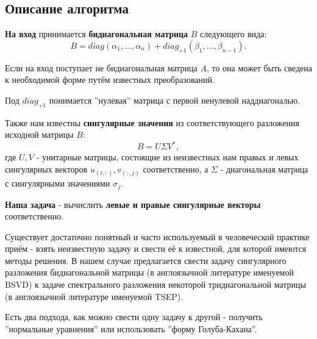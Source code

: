 

\subsection{Описание алгоритма}
\textbf{На вход} принимается \textbf{бидиагональная матрица} \(B\) следующего вида:
\[
        B= diag(\alpha_1,\dots,\alpha_n)+diag_{+1}(\beta_1,\dots,\beta_{n-1}).
\]

\begin{note}
    Если на вход поступает не бидиагональная матрица \(A\), то она может быть сведена к необходимой форме путём известных преобразований.
\end{note}

\begin{note}
    Под \(diag_{+1}\) понимается ''нулевая'' матрица с первой ненулевой наддиагональю.
\end{note}

Также нам известны \textbf{сингулярные значения} из соответствующего разложения исходной матрицы \(B\):
\begin{equation}
        B=U \Sigma V^*,
\end{equation}
где $U,V$ - унитарные матрицы, состоящие из неизвестных нам правых и левых сингулярных векторов $u_{(i,:)},v_{(:,j)}$ соответственно, а $\Sigma$ - диагональная матрица с сингулярными значениями \(\sigma_j\).

\textbf{Наша задача} - вычислить \textbf{левые и правые сингулярные векторы} соответственно.

Существует достаточно понятный и часто используемый в человеческой практике приём - взять неизвестную задачу и свести её к известной, для которой имеются методы решения. В нашем случае предлагается свести задачу сингулярного разложения бидиагональной матрицы (в англоязычной литературе именуемой BSVD) к задаче спектрального разложения некоторой тридиагональной матрицы (в англоязычной литературе именуемой TSEP).

Есть два подхода, как можно свести одну задачу к другой - получить ''нормальные уравнения'' или использовать ''форму Голуба-Кахана''.

